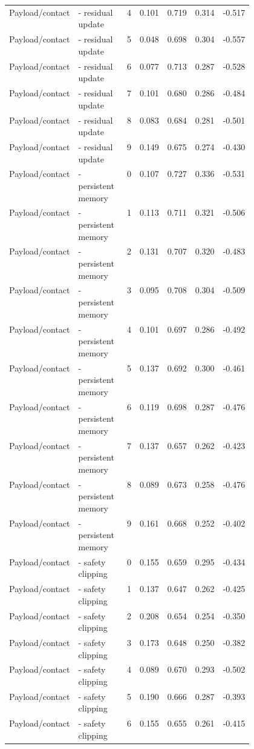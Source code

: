 \documentclass{article}
\begin{document}
\begin{center}
\begin{longtable}{p{0.13\linewidth}p{0.34\linewidth}rrrrr}
Payload/contact & - residual update & 4 & 0.101 & 0.719 & 0.314 & -0.517\\
Payload/contact & - residual update & 5 & 0.048 & 0.698 & 0.304 & -0.557\\
Payload/contact & - residual update & 6 & 0.077 & 0.713 & 0.287 & -0.528\\
Payload/contact & - residual update & 7 & 0.101 & 0.680 & 0.286 & -0.484\\
Payload/contact & - residual update & 8 & 0.083 & 0.684 & 0.281 & -0.501\\
Payload/contact & - residual update & 9 & 0.149 & 0.675 & 0.274 & -0.430\\
Payload/contact & - persistent memory & 0 & 0.107 & 0.727 & 0.336 & -0.531\\
Payload/contact & - persistent memory & 1 & 0.113 & 0.711 & 0.321 & -0.506\\
Payload/contact & - persistent memory & 2 & 0.131 & 0.707 & 0.320 & -0.483\\
Payload/contact & - persistent memory & 3 & 0.095 & 0.708 & 0.304 & -0.509\\
Payload/contact & - persistent memory & 4 & 0.101 & 0.697 & 0.286 & -0.492\\
Payload/contact & - persistent memory & 5 & 0.137 & 0.692 & 0.300 & -0.461\\
Payload/contact & - persistent memory & 6 & 0.119 & 0.698 & 0.287 & -0.476\\
Payload/contact & - persistent memory & 7 & 0.137 & 0.657 & 0.262 & -0.423\\
Payload/contact & - persistent memory & 8 & 0.089 & 0.673 & 0.258 & -0.476\\
Payload/contact & - persistent memory & 9 & 0.161 & 0.668 & 0.252 & -0.402\\
Payload/contact & - safety clipping & 0 & 0.155 & 0.659 & 0.295 & -0.434\\
Payload/contact & - safety clipping & 1 & 0.137 & 0.647 & 0.262 & -0.425\\
Payload/contact & - safety clipping & 2 & 0.208 & 0.654 & 0.254 & -0.350\\
Payload/contact & - safety clipping & 3 & 0.173 & 0.648 & 0.250 & -0.382\\
Payload/contact & - safety clipping & 4 & 0.089 & 0.670 & 0.293 & -0.502\\
Payload/contact & - safety clipping & 5 & 0.190 & 0.666 & 0.287 & -0.393\\
Payload/contact & - safety clipping & 6 & 0.155 & 0.655 & 0.261 & -0.415\\

\end{longtable}
\end{center}
\end{document}
